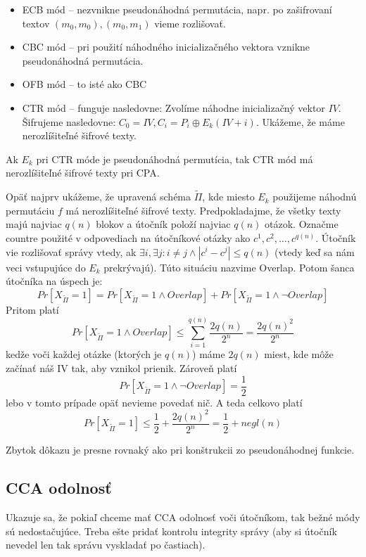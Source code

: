 \begin{itemize}
    \item ECB mód -- nezvnikne pseudonáhodná permutácia, 
        napr. po zašifrovaní textov $(m_0,m_0), (m_0, m_1)$ vieme rozlišovať.
    \item CBC mód -- pri použití náhodného inicializačného vektora 
        vznikne pseudonáhodná permutácia.
    \item OFB mód -- to isté ako CBC
    \item CTR mód -- funguje nasledovne: 
        Zvolíme náhodne inicializačný vektor $IV$.
        Šifrujeme nasledovne: $C_0 = IV, C_i = P_i \oplus E_k(IV + i)$.
        Ukážeme, že máme nerozlíšiteľné šifrové texty.
\end{itemize}
\begin{veta}
    Ak $E_k$ pri CTR móde je pseudonáhodná permutícia,
    tak CTR mód má nerozlíšiteľné šifrové texty pri CPA.
\end{veta}
\begin{dokaz}
    Opäť najprv ukážeme, že upravená schéma $\tilde{\Pi}$,
    kde miesto $E_k$ použijeme náhodnú permutáciu $f$
    má nerozlíšiteľné šifrové texty. 
    Predpokladajme, že všetky texty majú najviac $q(n)$ blokov 
    a útočník položí najviac $q(n)$ otázok.
    Označme countre použité v odpovediach na útočníkové otázky ako 
    $c^1, c^2, \dots, c^{q(n)}$. 
    Útočník vie rozlišovať správy vtedy, ak 
    $\exists i, \exists j \colon i\ne j \land  |c^i - c^j| \leq q(n)$ 
    (vtedy keď sa nám veci vstupujúce do $E_k$ \clqq prekrývajú\crqq).
    Túto situáciu nazvime Overlap.
    Potom šanca útočníka na úspech je:
    \begin{equation*}
        Pr[X_{\tilde{\Pi}} = 1] = 
            Pr[X_{\tilde{\Pi}} = 1 \land Overlap] + 
            Pr[X_{\tilde{\Pi}} = 1 \land \neg Overlap]
    \end{equation*}
    Pritom platí
    \begin{equation*}
        Pr[X_{\tilde{\Pi}} = 1 \land Overlap] \leq 
            \sum_{i=1}^{q(n)} \frac{2q(n)}{2^n} = \frac{2q(n)^2}{2^n}
    \end{equation*}
    kedže voči každej otázke (ktorých je $q(n)$) máme $2q(n)$ miest, 
    kde môže začínať náš IV tak, aby vznikol prienik.
    Zároveň platí
    \begin{equation*}
        Pr[X_{\tilde{\Pi}} = 1 \land \neg Overlap] = \frac{1}{2}
    \end{equation*}
    lebo v tomto prípade opäť nevieme povedať nič.
    A teda celkovo platí
    \begin{equation*}
        Pr[X_{\tilde{\Pi}} = 1] \leq \frac{1}{2} + \frac{2q(n)^2}{2^n} = 
            \frac12 + negl(n)
    \end{equation*}

    Zbytok dôkazu je presne rovnaký ako pri konštrukcii 
    zo pseudonáhodnej funkcie.
\end{dokaz}

\subsection{CCA odolnosť}
Ukazuje sa, že pokiaľ chceme mať CCA odolnosť voči útočníkom,
tak bežné módy sú nedostačujúce.
Treba ešte pridať kontrolu integrity správy 
(aby si útočník nevedel len tak správu vyskladať po častiach).
